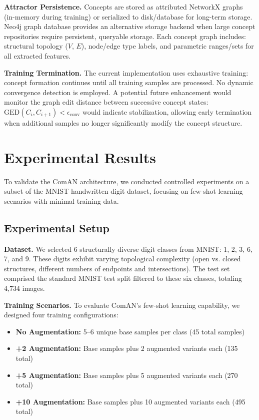 \documentclass[12pt, a4paper]{article}
\begin{document}
\textbf{Attractor Persistence.} Concepts are stored as attributed NetworkX graphs (in-memory during training) or serialized to disk/database for long-term storage. Neo4j graph database provides an alternative storage backend when large concept repositories require persistent, queryable storage. Each concept graph includes: structural topology ($V$, $E$), node/edge type labels, and parametric ranges/sets for all extracted features.

\textbf{Training Termination.} The current implementation uses exhaustive training: concept formation continues until all training samples are processed. No dynamic convergence detection is employed. A potential future enhancement would monitor the graph edit distance between successive concept states: $\text{GED}(C_i, C_{i+1}) < \epsilon_{\text{conv}}$ would indicate stabilization, allowing early termination when additional samples no longer significantly modify the concept structure.

\section{Experimental Results}

To validate the ComAN architecture, we conducted controlled experiments on a subset of the MNIST handwritten digit dataset, focusing on few-shot learning scenarios with minimal training data.

\subsection{Experimental Setup}

\textbf{Dataset.} We selected 6 structurally diverse digit classes from MNIST: 1, 2, 3, 6, 7, and 9. These digits exhibit varying topological complexity (open vs. closed structures, different numbers of endpoints and intersections). The test set comprised the standard MNIST test split filtered to these six classes, totaling 4,734 images.

\textbf{Training Scenarios.} To evaluate ComAN's few-shot learning capability, we designed four training configurations:
\begin{itemize}
\item \textbf{No Augmentation:} 5--6 unique base samples per class (45 total samples)
\item \textbf{+2 Augmentation:} Base samples plus 2 augmented variants each (135 total)
\item \textbf{+5 Augmentation:} Base samples plus 5 augmented variants each (270 total)
\item \textbf{+10 Augmentation:} Base samples plus 10 augmented variants each (495 total)
\end{itemize}
\end{document}
